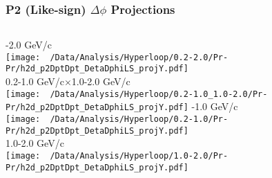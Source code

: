 \documentclass{beamer}
\begin{document}
\begin{frame}
	\frametitle{P2 (Like-sign) $\Delta\phi$ Projections}
	\begin{columns}
		-2.0 GeV/c\\
		\texttt{[image: ~/Data/Analysis/Hyperloop/0.2-2.0/Pr-Pr/h2d\_p2DptDpt\_DetaDphiLS\_projY.pdf]}\\0.2-1.0 GeV/c$\times$1.0-2.0 GeV/c\\
		\texttt{[image: ~/Data/Analysis/Hyperloop/0.2-1.0\_1.0-2.0/Pr-Pr/h2d\_p2DptDpt\_DetaDphiLS\_projY.pdf]}
		-1.0 GeV/c\\
		\texttt{[image: ~/Data/Analysis/Hyperloop/0.2-1.0/Pr-Pr/h2d\_p2DptDpt\_DetaDphiLS\_projY.pdf]}\\1.0-2.0 GeV/c\\
		\texttt{[image: ~/Data/Analysis/Hyperloop/1.0-2.0/Pr-Pr/h2d\_p2DptDpt\_DetaDphiLS\_projY.pdf]}
	\end{columns}
\end{frame}
\end{document}
